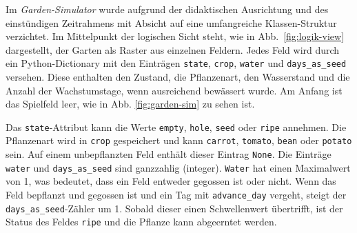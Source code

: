 Im \textit{Garden-Simulator} wurde aufgrund der didaktischen Ausrichtung und des einstündigen Zeitrahmens mit Absicht auf eine umfangreiche Klassen-Struktur verzichtet. Im Mittelpunkt der logischen Sicht steht, wie in Abb.~\ref{fig:logik-view} dargestellt, der Garten als Raster aus einzelnen Feldern. Jedes Feld wird durch ein Python-Dictionary mit den Einträgen \texttt{state}, \texttt{crop}, \texttt{water} und \texttt{days\_as\_seed} versehen. Diese enthalten den Zustand, die Pflanzenart, den Wasserstand und die Anzahl der Wachstumstage, wenn ausreichend bewässert wurde. Am Anfang ist das Spielfeld leer, wie in Abb. \ref{fig:garden-sim} zu sehen ist.


Das \texttt{state}-Attribut kann die Werte \texttt{empty}, \texttt{hole}, \texttt{seed} oder \texttt{ripe} annehmen. Die Pflanzenart wird in \texttt{crop} gespeichert und kann \texttt{carrot}, \texttt{tomato}, \texttt{bean} oder \texttt{potato} sein. Auf einem unbepflanzten Feld enthält dieser Eintrag \texttt{None}. Die Einträge \texttt{water} und \texttt{days\_as\_seed} sind ganzzahlig (integer). \texttt{Water} hat einen Maximalwert von 1, was bedeutet, dass ein Feld entweder gegossen ist oder nicht. Wenn das Feld bepflanzt und gegossen ist und ein Tag mit \texttt{advance\_day} vergeht, steigt der \texttt{days\_as\_seed}-Zähler um 1. Sobald dieser einen Schwellenwert übertrifft, ist der Status des Feldes \texttt{ripe} und die Pflanze kann abgeerntet werden.

